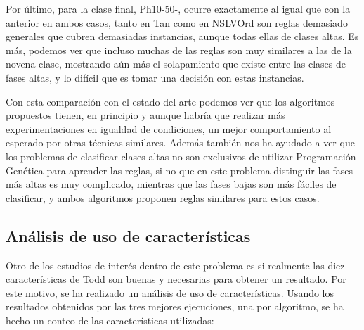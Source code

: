Por último, para la clase final, Ph10-50-, ocurre exactamente al igual que con la anterior en ambos casos, tanto en Tan como en NSLVOrd son reglas demasiado generales que cubren demasiadas instancias, aunque todas ellas de clases altas. Es más, podemos ver que incluso muchas de las reglas son muy similares a las de la novena clase, mostrando aún más el solapamiento que existe entre las clases de fases altas, y lo difícil que es tomar una decisión con estas instancias.


Con esta comparación con el estado del arte podemos ver que los algoritmos propuestos tienen, en principio y aunque habría que realizar más experimentaciones en igualdad de condiciones, un mejor comportamiento al esperado por otras técnicas similares. Además también nos ha ayudado a ver que los problemas de clasificar clases altas no son exclusivos de utilizar Programación Genética para aprender las reglas, si no que en este problema distinguir las fases más altas es muy complicado, mientras que las fases bajas son más fáciles de clasificar, y ambos algoritmos proponen reglas similares para estos casos.


\newpage


\subsection{Análisis de uso de características}

Otro de los estudios de interés dentro de este problema es si realmente las diez características de Todd son buenas y necesarias para obtener un resultado. Por este motivo, se ha realizado un análisis de uso de características. Usando los resultados obtenidos por las tres mejores ejecuciones, una por algoritmo, se ha hecho un conteo de las características utilizadas:

